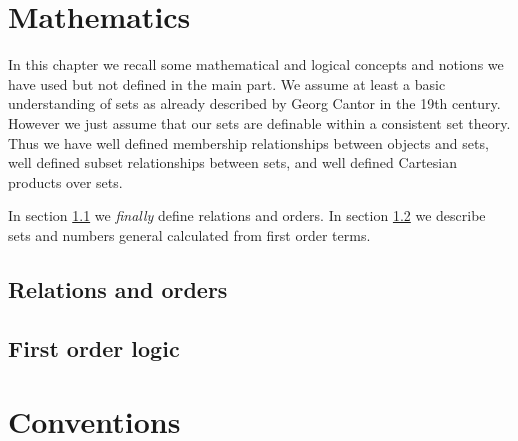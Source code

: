 



\chapter{Mathematics}





In this chapter we recall some mathematical and logical concepts and notions 
we have used but not defined in the main part.
We assume at least a {\myem basic} understanding of sets as already 
described by Georg Cantor in the 19th century. 
However we just assume that our sets are definable within a consistent set theory.
Thus we have well defined {\myem membership} relationships between objects and sets,
well defined {\myem subset} relationships between sets, 
and well defined {\myem Cartesian products} over sets.

In section \ref{sec:app:maths} we {\em finally} define {\myem relations} and {\myem orders}. 
In section \ref{sec:app:fol} we describe sets and numbers general calculated from first order terms.



\section{Relations and orders}\label{sec:app:maths}



\section{First order logic}\label{sec:app:fol}




\chapter{Conventions}

